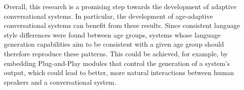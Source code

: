 Overall, this research is a promising step towards the development of adaptive conversational systems. In particular, the development of age-adaptive conversational systems can benefit from these results. Since consistent language style differences
were found between age groups, systems whose language generation capabilities aim to be consistent with a given age group should therefore reproduce these patterns. This could be achieved, for example, by embedding Plug-and-Play modules that control the generation of a system’s output, which could lead to better, more natural interactions between human speakers and a conversational system.

